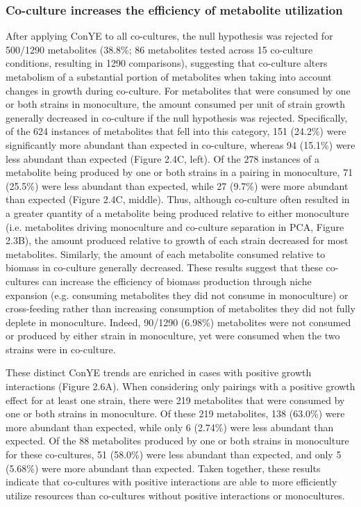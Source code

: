 \documentclass[11pt,twocolumn,notitlepage,openany,twoside]{book}
\begin{document}
\begin{refsection}
\subsubsection{Co-culture increases the efficiency of metabolite utilization}

After applying ConYE to all co-cultures, the null hypothesis was rejected for 500/1290 metabolites (38.8\%; 86 metabolites tested across 15 co-culture conditions, resulting in 1290 comparisons), suggesting that co-culture alters metabolism of a substantial portion of metabolites when taking into account changes in growth during co-culture. For metabolites that were consumed by one or both strains in monoculture, the amount consumed per unit of strain growth generally decreased in co-culture if the null hypothesis was rejected. Specifically, of the 624 instances of metabolites that fell into this category, 151 (24.2\%) were significantly more abundant than expected in co-culture, whereas 94 (15.1\%) were less abundant than expected (Figure 2.4C, left). Of the 278 instances of a metabolite being produced by one or both strains in a pairing in monoculture, 71 (25.5\%) were less abundant than expected, while 27 (9.7\%) were more abundant than expected (Figure 2.4C, middle). Thus, although co-culture often resulted in a greater quantity of a metabolite being produced relative to either monoculture (i.e. metabolites driving monoculture and co-culture separation in PCA, Figure 2.3B), the amount produced relative to growth of each strain decreased for most metabolites. Similarly, the amount of each metabolite consumed relative to biomass in co-culture generally decreased. These results suggest that these co-cultures can increase the efficiency of biomass production through niche expansion (e.g. consuming metabolites they did not consume in monoculture) or cross-feeding rather than increasing consumption of metabolites they did not fully deplete in monoculture. Indeed, 90/1290 (6.98\%) metabolites were not consumed or produced by either strain in monoculture, yet were consumed when the two strains were in co-culture.

These distinct ConYE trends are enriched in cases with positive growth interactions (Figure 2.6A). When considering only pairings with a positive growth effect for at least one strain, there were 219 metabolites that were consumed by one or both strains in monoculture. Of these 219 metabolites, 138 (63.0\%) were more abundant than expected, while only 6 (2.74\%) were less abundant than expected. Of the 88 metabolites produced by one or both strains in monoculture for these co-cultures, 51 (58.0\%) were less abundant than expected, and only 5 (5.68\%) were more abundant than expected. Taken together, these results indicate that co-cultures with positive interactions are able to more efficiently utilize resources than co-cultures without positive interactions or monocultures.


\end{refsection}
\end{document}
